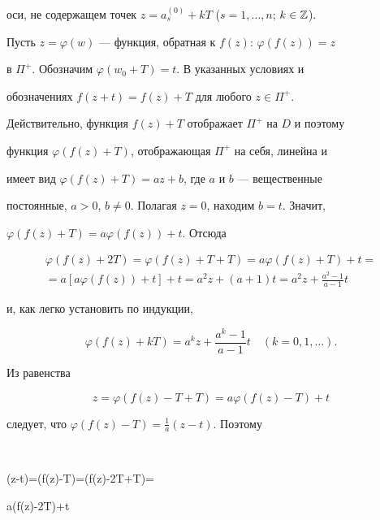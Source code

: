 оси, не содержащем точек $z=a^{(0)}_s+kT$ ($s=1,\dotsc,n$; $k\in\Bbb 


Z$). 


 


Пусть $z=\varphi(w)$ --- функция, обратная к $f(z)$: $\varphi(f(z))=z$ 


в $\Pi^+$. Обозначим $\varphi(w_0+T)=t$. В указанных условиях и 


обозначениях $f(z+t)=f(z)+T$ для любого $z\in\Pi^+$. 


 


Действительно, функция $f(z)+T$ отображает $\Pi^+$ на $D$ и поэтому 


функция $\varphi(f(z)+T)$, отображающая $\Pi^+$ на себя, линейна и 


имеет вид $\varphi(f(z)+T)=az+b$, где $a$ и $b$ --- вещественные 


постоянные, $a>0$, $b\ne 0$. Полагая $z=0$, находим $b=t$. Значит, 


$\varphi(f(z)+T)=a\varphi(f(z))+t$. Отсюда 


\begin{multline*} 


\varphi(f(z)+2T)=\varphi(f(z)+T+T)=a\varphi(f(z)+T)+t= \\ 


=a[a\varphi(f(z))+t]+t=a^2z+(a+1)t=a^2z+\frac{a^2-1}{a-1}t 


\end{multline*} 


и, как легко установить по индукции, 


\begin{equation} 


\varphi(f(z)+kT)=a^k z+\frac{a^k-1}{a-1}t\quad (k=0,1,\dotsc). 


\end{equation} 


 


Из равенства 


$$ 


z=\varphi(f(z)-T+T)=a\varphi(f(z)-T)+t 


$$ 


следует, что $\varphi(f(z)-T)=\frac{1}{a}(z-t)$. Поэтому 


$$ 


(z-t)=\varphi(f(z)-T)=\varphi(f(z)-2T+T)= 


a\varphi(f(z)-2T)+t 


